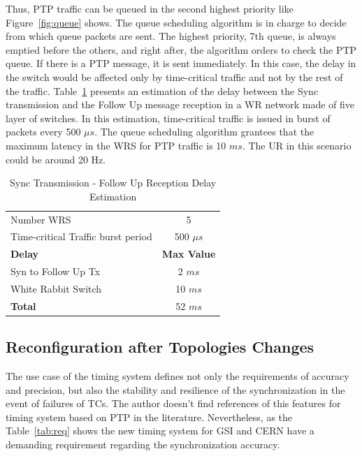 Thus, PTP traffic can be queued in the second highest priority like Figure~\ref{fig:queue} 
shows. The queue scheduling algorithm is in charge to decide from which queue packets
are sent. The highest priority, 7th queue, is always emptied before the others,
and right after, the algorithm orders to check the PTP queue. If there is a  PTP message, it is sent
immediately. In this case, the delay in the switch would be affected only by
time-critical traffic and not by the rest of the traffic. Table~\ref{tab:delay}
presents an estimation of the delay between the Sync transmission and the Follow Up message reception
in a WR network made of five layer of switches. In this estimation, time-critical traffic is issued in burst of 
packets every 500 $\mu s$. The queue scheduling algorithm grantees that the maximum latency in the WRS for PTP traffic is 10 $ms$. The UR in this scenario could be around 20 Hz.

\begin{table}[!t]
\caption{Sync Transmission - Follow Up Reception Delay Estimation}
\centering
\begin{tabular}{l c }   
\hline
Number WRS & 5  \\
Time-critical Traffic burst period & 500 $\mu s$ \\
\hline
 \textbf{Delay}              &  \textbf{Max Value}     \\  \hline \hline
 Syn to Follow Up Tx            & 2 $ms$    \\ \hline
 White Rabbit Switch            &     10 $ms$      \\ \hline
\hline
 \textbf{Total}                          &  52 $ms$          \\
\hline
\end{tabular}
\label{tab:delay}
\end{table}

\subsection{Reconfiguration after Topologies Changes}

The use case of the timing system defines not only the requirements of accuracy
and precision, but also the stability and resilience of the synchronization in the event
of failures of TCs. The author doesn't find references of this features for timing system based on PTP in the
literature. Nevertheless, as the Table~\ref{tab:req} shows the new timing system for GSI and CERN  have a demanding requirement
regarding the synchronization accuracy. 

